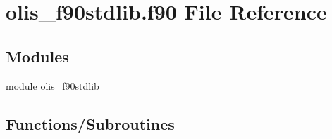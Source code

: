 \hypertarget{olis__f90stdlib_8f90}{}\section{olis\+\_\+f90stdlib.\+f90 File Reference}
\label{olis__f90stdlib_8f90}
\subsection*{Modules}
\begin{DoxyCompactItemize}
\item 
module \hyperlink{namespaceolis__f90stdlib}{olis\+\_\+f90stdlib}
\end{DoxyCompactItemize}
\subsection*{Functions/\+Subroutines}
